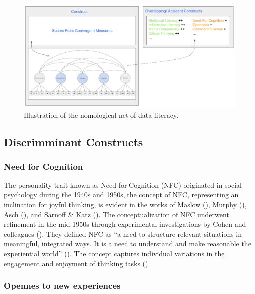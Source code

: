 \documentclass[
  12pt,
  a4paper,
  twoside]{article}
\begin{document}
\begin{figure}

{\centering \includegraphics[width=1\linewidth]{images/DL_Nomological_Net} 

}

\caption{Illustration of the nomological net of data literacy.  }\label{fig:workflow}
\end{figure}

\subsection{Discrimminant Constructs}\label{discrimminant-constructs}

\subsubsection{Need for Cognition}\label{need-for-cognition}

The personality trait known as Need for Cognition (NFC) originated in social psychology during the 1940s and 1950s, the concept of NFC, representing an inclination for joyful thinking, is evident in the works of Maslow (), Murphy (), Asch (), and Sarnoff \& Katz (). The conceptualization of NFC underwent refinement in the mid-1950s through experimental investigations by Cohen and colleagues (). They defined NFC as ``a need to structure relevant situations in meaningful, integrated ways. It is a need to understand and make reasonable the experiential world'' (). The concept captures individual variations in the engagement and enjoyment of thinking tasks ().

\subsubsection{Opennes to new experiences}\label{opennes-to-new-experiences}
\end{document}
